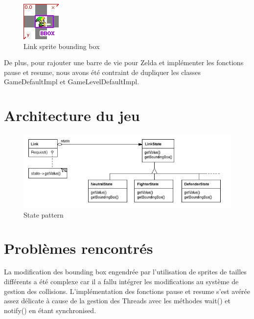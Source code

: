 \begin{figure}[ht!]
  \center
  \includegraphics{resources/bbox.png}
  \caption{Link sprite bounding box}
  \label{fig:Link sprite bounding box}
\end{figure}

De plus, pour rajouter une barre de vie pour Zelda et implémenter les fonctions pause et resume, nous avons été contraint de dupliquer les classes GameDefaultImpl et GameLevelDefaultImpl.


\section{Architecture du jeu}

\begin{figure}[ht!]
  \center
  \includegraphics[width=16cm,keepaspectratio]{resources/state_pattern.png}
  \caption{State pattern}
  \label{fig:State pattern}
\end{figure}


\section{Problèmes rencontrés}
La modification des bounding box engendrée par l'utilisation de sprites de tailles différents a été complexe car il a fallu intégrer les modifications au système de gestion des collisions.
L'implémentation des fonctions pause et resume s'est avérée assez délicate à cause de la gestion des Threads avec les méthodes wait() et notify() en étant synchronised.